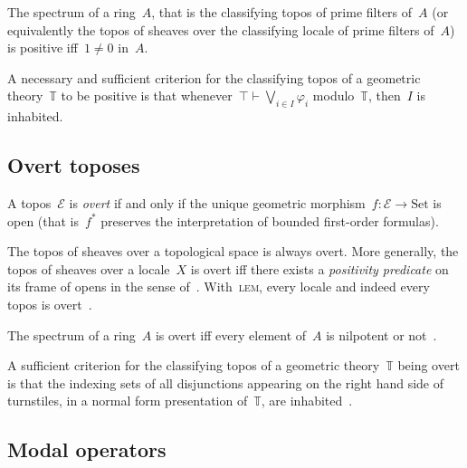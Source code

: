 \documentclass[envcountsect,envcountsame,runningheads]{llncs}
\newcommand{\E}{\mathcal{E}}
\newcommand{\TT}{\mathbb{T}}
\newcommand{\Set}{\mathrm{Set}}
\renewcommand{\_}{\mathpunct{.}\,}
\newcommand{\?}{\,{:}\,}
\begin{document}
\begin{example}The spectrum of a ring~$A$, that is the classifying topos of prime
filters of~$A$ (or equivalently the topos of sheaves over the classifying
locale of prime filters of~$A$) is positive iff~$1 \neq 0$ in~$A$.\end{example}

\begin{example}A necessary and sufficient criterion for the classifying topos of a geometric
theory~$\TT$ to be positive is that whenever~$\top \vdash \bigvee_{i \in I} \varphi_i$ modulo~$\TT$, then~$I$ is inhabited.\end{example}


\subsection{Overt toposes}

\begin{definition}A topos~$\E$ is \emph{overt} if and only if the unique geometric
morphism~$f : \E \to \Set$ is open (that is~$f^*$ preserves the interpretation of
bounded first-order formulas).\end{definition}

\begin{example}The topos of sheaves over a topological space is always overt. More
generally, the topos of sheaves over a locale~$X$ is overt iff there exists a
\emph{positivity predicate} on its frame of opens in the sense of~\cite{xxx}.
With~\textsc{lem}, every locale and indeed every topos is overt~\cite{xxx}.\end{example}

\begin{example}The spectrum of a ring~$A$ is overt iff every element of~$A$ is
nilpotent or not~\cite[Proposition~12.51]{blechschmidt:phd}.\end{example}

\begin{example}A sufficient criterion for the classifying topos of a geometric
theory~$\TT$ being overt is that the indexing sets of all disjunctions
appearing on the right hand side of turnstiles, in a normal form presentation
of~$\TT$, are inhabited~\cite[Proposition~V.3.2]{joyal-tierney:grothendieck}.\end{example}


\subsection{Modal operators}
\end{document}
